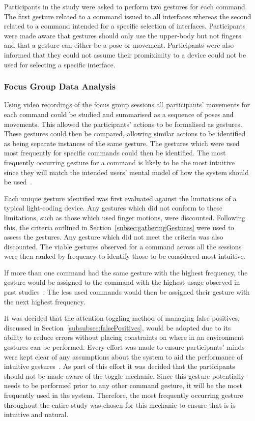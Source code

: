 \documentclass[link]{IWCOMP}
\begin{document}
Participants in the study were asked to perform two gestures for each command.
The first gesture related to a command issued to all interfaces whereas the second related to a command intended for a specific selection of interfaces.
Participants were made aware that gestures should only use the upper-body but not fingers and that a gesture can either be a pose or movement.
Participants were also informed that they could not assume their promiximity to a device could not be used for selecting a specific interface.

\subsubsection{Focus Group Data Analysis}
\label{subsubsec:focusGroupDataAnalysis}

Using video recordings of the focus group sessions all participants' movements for each command could be studied and summarised as a sequence of poses and movements.
This allowed the participants' actions to be formalised as gestures.
These gestures could then be compared, allowing similar actions to be identified as being separate instances of the same gesture.
The gestures which were used most frequently for specific commands could then be identified.
The most frequently occurring gesture for a command is likely to be the most intuitive since they will match the intended users' mental model of how the system should be used~\cite{Nielsen2004,Ruiz2011,Wobbrock2009}.

Each unique gesture identified was first evaluated against the limitations of a typical light-coding device.
Any gestures which did not conform to these limitations, such as those which used finger motions, were discounted.
Following this, the criteria outlined in Section~\ref{subsec:gatheringGestures} were used to assess the gestures.
Any gesture which did not meet the criteria was also discounted.
The viable gestures observed for a command across all the sessions were then ranked by frequency to identify those to be considered most intuitive.

If more than one command had the same gesture with the highest frequency, the gesture would be assigned to the command with the highest usage observed in past studies~\cite{HatchA.HigginsSMercier2009}.
The less used commands would then be assigned their gesture with the next highest frequency.

It was decided that the attention toggling method of managing false positives, discussed in Section~\ref{subsubsec:falsePositives}, would be adopted due to its ability to reduce errors without placing constraints on where in an environment gestures can be performed.
Every effort was made to ensure participants' minds were kept clear of any assumptions about the system to aid the performance of intuitive gestures~\cite{Nielsen2004}.
As part of this effort it was decided that the participants should not be made aware of the toggle mechanic.
Since this gesture potentially needs to be performed prior to any other command gesture, it will be the most frequently used in the system.
Therefore, the most frequently occurring gesture throughout the entire study was chosen for this mechanic to ensure that is is intuitive and natural.
\end{document}

